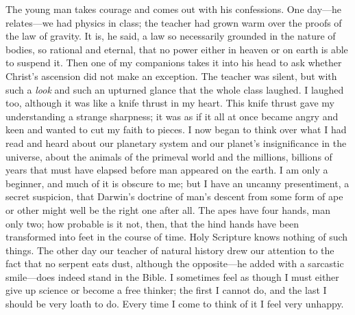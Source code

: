 \documentclass[12pt,a4paper,openany]{book}
\newcommand{\opage}[1]{\marginnote{\footnotesize\textit{[#1]}}}
\begin{document}
The young man takes courage and comes out with his confessions. One
day---he relates---we had physics in class; the teacher had grown warm
over the proofs of the law of gravity. It is, he said, a law so
necessarily grounded in the nature of bodies, so rational and eternal,
that no power either in heaven or on earth is able to suspend it. Then
one of my companions takes it into his head to ask whether Christ's
ascension did not make an exception. The teacher was silent, but with
such a \emph{look} and such an upturned glance that the whole class
laughed. I laughed too, although it was like a knife thrust in my heart.
This knife thrust gave my understanding a strange sharpness; it was as
if it all at once became angry and keen and wanted to cut my faith to
pieces. I now began to think over what I had read and heard about our
planetary system and our planet's insignificance in the universe, about
the animals of the primeval world and the millions, billions of years
that must have \opage{48}elapsed before man appeared on the earth. I am only a
beginner, and much of it is obscure to me; but I have an uncanny
presentiment, a secret suspicion, that Darwin's doctrine of man's
descent from some form of ape or other might well be the right one after
all. The apes have four hands, man only two; how probable is it not, then,
that the hind hands have been transformed into feet in the course of
time. Holy Scripture knows nothing of such things. The other day our
teacher of natural history drew our attention to the fact that no
serpent eats dust, although the opposite---he added with a sarcastic
smile---does indeed stand in the Bible. %
I sometimes feel as though I must either give up science or become a
free thinker; the first I cannot do, and the last I should be very loath
to do. Every time I come to think of it I feel very unhappy.
\end{document}
